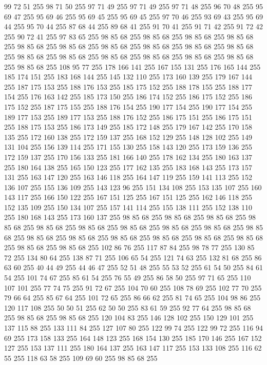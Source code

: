 99 72 51 255 98 71 50 255 97 71 49 255 97 71 49 255 97 71 48 255 96 70 48 255 95 69 47 255 95 69 46 255 95 69 45 255 95 69 45 255 97 70 46 255 93 69 43 255 95 69 44 255 95 70 44 255 87 68 44 255 89 68 41 255 91 70 41 255 91 71 42 255 91 72 42 255 90 72 41 255 97 83 65 255 98 85 68 255 98 85 68 255 98 85 68 255 98 85 68 255 98 85 68 255 98 85 68 255 98 85 68 255 98 85 68 255 98 85 68 255 98 85 68 255 98 85 68 255 98 85 68 255 98 85 68 255 98 85 68 255 98 85 68 255 98 85 68 255 98 85 68 255 108 95 77 255 178 166 141 255 167 155 131 255 176 165 144 255 185 174 151 255 183 168 144 255 145 132 110 255 173 160 139 255 179 167 144 255 187 175 153 255 188 176 153 255 185 175 152 255 188 178 155 255 188 177 154 255 176 163 142 255 185 173 150 255 186 174 152 255 186 175 152 255 186 175 152 255 187 175 155 255 188 176 154 255 190 177 154 255 190 177 154 255 189 177 153 255 189 177 153 255 188 176 152 255
186 175 151 255 186 175 151 255 188 175 153 255 186 173 149 255 185 172 148 255 179 167 142 255 170 158 135 255 172 160 138 255 172 159 137 255 168 152 129 255 148 128 102 255 149 131 104 255 156 139 114 255 171 155 130 255 158 143 120 255 173 159 136 255 172 159 137 255 170 156 133 255 181 166 140 255 178 162 134 255 180 163 137 255 180 164 138 255 165 150 123 255 177 162 135 255 183 168 143 255 173 157 131 255 163 147 120 255 163 146 118 255 164 147 119 255 159 141 113 255 152 136 107 255 155 136 109 255 143 123 96 255 151 134 108 255 153 135 107 255 160 143 117 255 166 150 122 255 167 151 125 255 167 151 125 255 162 146 118 255 152 135 109 255 150 134 107 255 157 141 114 255 155 138 111 255 152 138 110 255 180 168 143 255 173 160 137 255 98 85 68 255 98 85 68 255 98 85 68 255 98 85 68 255 98 85 68 255 98 85 68 255 98 85 68 255 98 85 68 255 98 85 68 255 98 85 68 255 98 85 68 255 98 85 68 255 98 85 68 255 98 85 68 255 98 85 68 255 98 85 68 255 98 85 68 255
98 85 68 255 102 86 76 255 117 87 84 255 98 78 77 255 130 85 72 255 134 80 64 255 138 87 71 255 106 65 54 255 121 74 63 255 132 81 68 255 86 63 60 255 40 44 49 255 44 46 47 255 52 51 48 255 55 53 52 255 61 54 50 255 84 61 54 255 101 74 67 255 85 61 54 255 76 55 49 255 86 58 50 255 97 71 65 255 110 107 101 255 77 74 75 255 91 72 67 255 104 70 60 255 108 78 69 255 102 77 70 255 79 66 64 255 85 67 64 255 101 72 65 255 86 66 62 255 81 74 65 255 104 98 86 255 120 117 108 255 50 50 51 255 62 50 50 255 83 61 59 255 92 77 64 255 98 85 68 255 98 85 68 255 98 85 68 255 120 104 83 255 146 128 102 255 150 129 101 255 137 115 88 255 133 111 84 255 127 107 80 255 122 99 74 255 122 99 72 255 116 94 69 255 173 158 133 255 164 148 123 255 168 154 130 255 185 170 146 255 167 152 127 255 153 137 111 255 180 164 137 255 163 147 117 255 153 133 108 255 116 62 55 255 118 63 58 255 109 69 60 255 98 85 68 255
